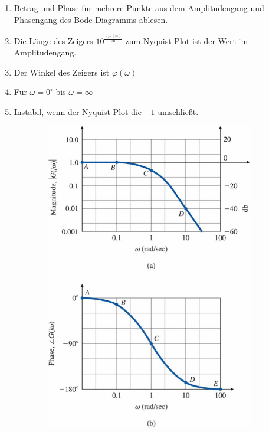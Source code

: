 \begin{tcolorbox}[colback=white!10!white,
                  colframe=blue!50!white,
                  title=Konstruktionsregeln Nyquist-Diagramm]
    \begin{enumerate}
    \item Betrag und Phase für mehrere Punkte aus dem Amplitudengang und 
        Phasengang des Bode-Diagramms ablesen. 
    \item Die Länge des Zeigers $10^{\frac{A_{dB}(\omega)}{20}}$ zum Nyquist-Plot ist der 
        Wert im Amplitudengang.
    \item Der Winkel des Zeigers ist $\varphi(\omega)$
    \item Für $\omega = 0^{\circ}$ bis $\omega = \infty$
    \item Instabil, wenn der Nyquist-Plot die $-1$ umschließt.
\end{enumerate}
\begin{figure}[H]
    \begin{subfigure}{0.5\linewidth}
        \includegraphics[width=\linewidth]{images/nyquist2}

\end{subfigure}
\end{figure}
\end{tcolorbox}
